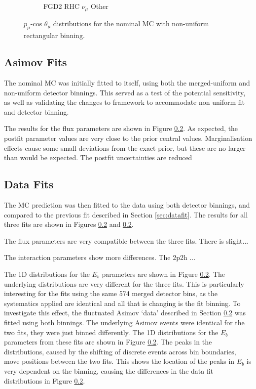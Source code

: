 \begin{figure}
\begin{subfigure}{.32\textwidth}
  \caption{FGD2 RHC $\nu_{\mu}$ Other}
  \label{fig:th2polynomFGD2_NuMuBkg_CCOther_in_AntiNu_Mode}
\end{subfigure}
\caption{$p_{\mu}$-cos $\theta_{\mu}$ distributions for the nominal MC with non-uniform rectangular binning.}
\label{fig:th2polynombin}
\end{figure}

\subsection{Asimov Fits}

The nominal MC was initially fitted to itself, using both the merged-uniform and non-uniform detector binnings. This served as a test of the potential sensitivity, as well as validating the changes to framework to accommodate non uniform fit and detector binning. 

The results for the flux parameters are shown in Figure \ref{}. As expected, the postfit parameter values are very close to the prior central values. Marginalisation effects cause some small deviations from the exact prior, but these are no larger than would be expected. The postfit uncertainties are reduced %

\subsection{Data Fits}

The MC prediction was then fitted to the data using both detector binnings, and compared to the previous fit described in Section \ref{sec:datafit}. The results for all three fits are shown in Figures \ref{} and \ref{}. 

The flux parameters are very compatible between the three fits. There is slight...

The interaction parameters show more differences. The 2p2h ...

The 1D distributions for the $E_{b}$ parameters are shown in Figure \ref{}. The underlying distributions are very different for the three fits. This is particularly interesting for the fits using the same 574 merged detector bins, as the systematics applied are identical and all that is changing is the fit binning. To investigate this effect, the fluctuated Asimov `data' described in Section \ref{} was fitted using both binnings. The underlying Asimov events were identical for the two fits, they were just binned differently. The 1D distributions for the $E_{b}$ parameters from these fits are shown in Figure \ref{}. The peaks in the distributions, caused by the shifting of discrete events across bin boundaries, move positions between the two fits. This shows the location of the peaks in $E_{b}$ is very dependent on the binning, causing the differences in the data fit distributions in Figure \ref{}.

